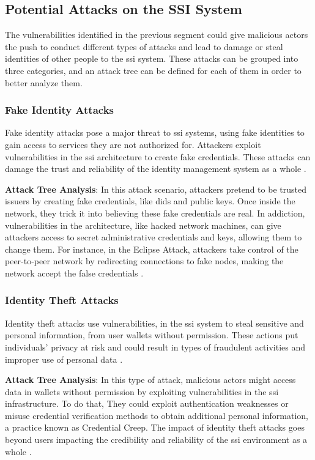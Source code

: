 \subsection{Potential Attacks on the SSI System}

The vulnerabilities identified in the previous segment could give malicious actors the push to conduct different types of attacks and lead to damage or steal identities of other 
people to the \gls{ssi} system. These attacks can be grouped into three categories, and an attack tree can be defined for each of them in order to better analyze them.

\subsubsection{Fake Identity Attacks}

Fake identity attacks pose a major threat to \gls{ssi} systems, using fake identities to gain access to services they are not authorized for. Attackers exploit vulnerabilities in 
the \gls{ssi} architecture to create fake credentials. These attacks can damage the trust and reliability of the identity management system as a whole \cite{CyberSecurity}.

\textbf{Attack Tree Analysis}: In this attack scenario, attackers pretend to be trusted issuers by creating fake credentials, like \gls{did}s and public keys. Once inside the 
network, they trick it into believing these fake credentials are real. In addiction, vulnerabilities in the architecture, like hacked network machines, can give attackers 
access to secret administrative credentials and keys, allowing them to change them. For instance, in the Eclipse Attack, attackers take control of the peer-to-peer network 
by redirecting connections to fake nodes, making the network accept the false credentials \cite{9659929}.

\subsubsection{Identity Theft Attacks}

Identity theft attacks use vulnerabilities, in the \gls{ssi} system to steal sensitive and personal information, from user wallets without permission. These actions put 
individuals’ privacy at risk and could result in types of fraudulent activities and improper use of personal data \cite{CyberSecurity}. 

\textbf{Attack Tree Analysis}: In this type of attack, malicious actors might access data in wallets without permission by exploiting vulnerabilities in the \gls{ssi} 
infrastructure. To do that, They could exploit authentication weaknesses or misuse credential verification methods to obtain additional personal information, a practice 
known as Credential Creep. The impact of identity theft attacks goes beyond users impacting the credibility and reliability of the \gls{ssi} environment as a whole \cite{9659929}. 

